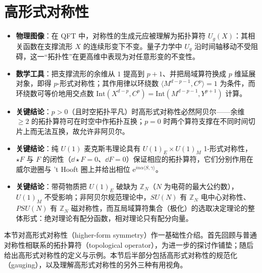
\section{高形式对称性}\label{sec:higher-form-gen}

\begin{keytakeaways}
  \begin{itemize}[leftmargin=1.4em,itemsep=2pt,topsep=2pt]
    \item \textbf{物理图像}：在 QFT 中，对称性的生成元应被理解为拓扑算符 $U_g(X)$：其相关函数在支撑流形 $X$ 的连续形变下不变。量子力学中 $U_g$ 沿时间轴移动不受阻碍，这一“拓扑性”在更高维中表现为对任意形变的不变性。
    \item \textbf{数学工具}：把支撑流形的余维从 $1$ 提高到 $p+1$、并把局域算符换成 $p$ 维延展对象，即得 $p$-形式对称性；其作用律以环绕数 $\langle M^{d-p-1},C^{p}\rangle=1$ 为条件，而环绕数可等价地用交点数 $\mathrm{Int}(X^{d-p},C^{p})=\mathrm{Int}(M^{d-p-1},Y^{p+1})$ 计算。
    \item \textbf{关键结论}：$p>0$（且时空拓扑平凡）时高形式对称性必然阿贝尔——余维 $\ge2$ 的拓扑算符可在时空中作拓扑互换；$p=0$ 时两个算符支撑在不同时间切片上而无法互换，故允许非阿贝尔。
    \item \textbf{关键结论}：纯 $U(1)$ 麦克斯韦理论具有 $U(1)_E\times U(1)_M$ 1-形式对称性，$\star F$ 与 $F$ 的闭性（$\dd\star F=0$、$\dd F=0$）保证相应的拓扑算符，它们分别作用在威尔逊圈与 't Hooft 圈上并给出相位 $\mathrm{e}^{in\alpha\langle S,\gamma\rangle}$。
    \item \textbf{关键结论}：带荷物质把 $U(1)_E$ 破缺为 $\mathbb{Z}_N$（$N$ 为电荷的最大公约数），$U(1)_M$ 不受影响；非阿贝尔规范理论中，$SU(N)$ 有 $\mathbb{Z}_N$ 电中心对称性、$PSU(N)$ 有 $\mathbb{Z}_N$ 磁对称性，而互局域算符集合（极化）的选取决定理论的整体形式：绝对理论有配分函数，相对理论只有配分向量。
  \end{itemize}
\end{keytakeaways}

本节对高形式对称性（higher-form symmetry）作一基础性介绍。首先回顾与普通对称性相联系的拓扑算符（topological operator），为进一步的探讨作铺垫；随后给出高形式对称性的定义与示例。本节后半部分包括高形式对称性的规范化（gauging），以及理解高形式对称性的另外三种有用视角。

